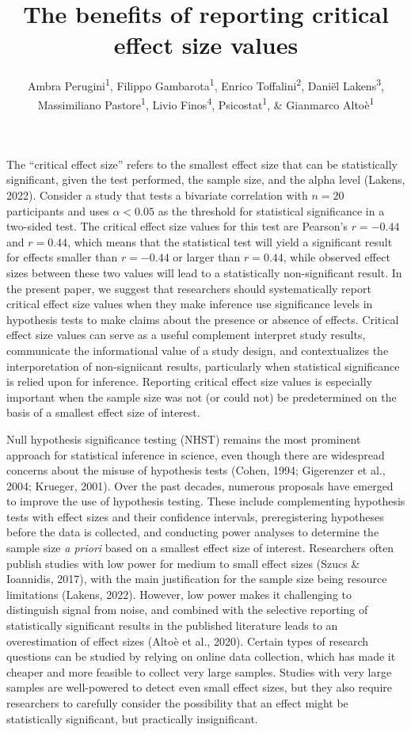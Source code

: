 \documentclass[
  man]{apa7}
\title{The benefits of reporting critical effect size values}
\author{Ambra Perugini\textsuperscript{1}, Filippo Gambarota\textsuperscript{1}, Enrico Toffalini\textsuperscript{2}, Daniël Lakens\textsuperscript{3}, Massimiliano Pastore\textsuperscript{1}, Livio Finos\textsuperscript{4}, Psicostat\textsuperscript{1}, \& Gianmarco Altoè\textsuperscript{1}}
\date{}
\affiliation{\vspace{0.5cm}\textsuperscript{1} Department of Developmental and Social Psychology, University of Padova, Italy\\\textsuperscript{2} Department of General Psychology, University of Padova, Italy\\\textsuperscript{3} Eindhoven University of Technology, Netherlands\\\textsuperscript{4} Department of Statistics, University of Padova, Italy}
\begin{document}
\maketitle

The ``critical effect size'' refers to the smallest effect size that can be statistically significant, given the test performed, the sample size, and the alpha level (Lakens, 2022). Consider a study that tests a bivariate correlation with \(n = 20\) participants and uses \(\alpha < 0.05\) as the threshold for statistical significance in a two-sided test. The critical effect size values for this test are Pearson's \(r = -0.44\) and \(r = 0.44\), which means that the statistical test will yield a significant result for effects smaller than \(r = -0.44\) or larger than \(r = 0.44\), while observed effect sizes between these two values will lead to a statistically non-significant result. In the present paper, we suggest that researchers should systematically report critical effect size values when they make inference use significance levels in hypothesis tests to make claims about the presence or absence of effects. Critical effect size values can serve as a useful complement interpret study results, communicate the informational value of a study design, and contextualizes the interporetation of non-signiicant results, particularly when statistical significance is relied upon for inference. Reporting critical effect size values is especially important when the sample size was not (or could not) be predetermined on the basis of a smallest effect size of interest.

Null hypothesis significance testing (NHST) remains the most prominent approach for statistical inference in science, even though there are widespread concerns about the misuse of hypothesis tests (Cohen, 1994; Gigerenzer et al., 2004; Krueger, 2001). Over the past decades, numerous proposals have emerged to improve the use of hypothesis testing. These include complementing hypothesis tests with effect sizes and their confidence intervals, preregistering hypotheses before the data is collected, and conducting power analyses to determine the sample size \textit{a priori} based on a smallest effect size of interest. Researchers often publish studies with low power for medium to small effect sizes (Szucs \& Ioannidis, 2017), with the main justification for the sample size being resource limitations (Lakens, 2022). However, low power makes it challenging to distinguish signal from noise, and combined with the selective reporting of statistically significant results in the published literature leads to an overestimation of effect sizes (Altoè et al., 2020). Certain types of research questions can be studied by relying on online data collection, which has made it cheaper and more feasible to collect very large samples. Studies with very large samples are well-powered to detect even small effect sizes, but they also require researchers to carefully consider the possibility that an effect might be statistically significant, but practically insignificant.
\end{document}
